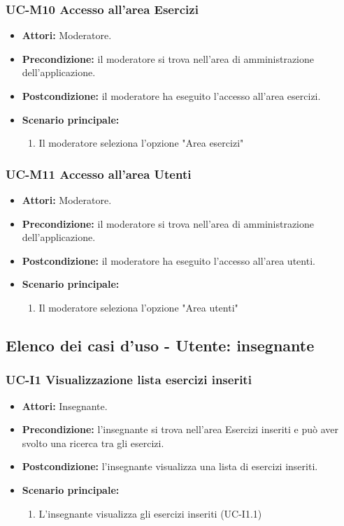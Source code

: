 \subsubsection{UC-M10 Accesso all'area Esercizi}
\begin{itemize}
	\item \textbf{Attori:} Moderatore.
	\item \textbf{Precondizione:} il moderatore si trova nell'area di amministrazione dell'applicazione.
	\item \textbf{Postcondizione:} il moderatore ha eseguito l'accesso all'area esercizi.
	\item \textbf{Scenario principale:}
	\begin{enumerate}
		\item Il moderatore seleziona l'opzione "Area esercizi"
	\end{enumerate}
\end{itemize}

\subsubsection{UC-M11 Accesso all'area Utenti}
\begin{itemize}
	\item \textbf{Attori:} Moderatore.
	\item \textbf{Precondizione:} il moderatore si trova nell'area di amministrazione dell'applicazione.
	\item \textbf{Postcondizione:} il moderatore ha eseguito l'accesso all'area utenti.
	\item \textbf{Scenario principale:}
	\begin{enumerate}
		\item Il moderatore seleziona l'opzione "Area utenti"
	\end{enumerate}
\end{itemize}

\subsection{Elenco dei casi d'uso - Utente: insegnante}		
\subsubsection{UC-I1 Visualizzazione lista esercizi inseriti}
\begin{itemize}
\item \textbf{Attori: }Insegnante.
		\item \textbf{Precondizione: }l'insegnante si trova nell'area Esercizi inseriti e può aver svolto una ricerca tra gli esercizi.
		\item \textbf{Postcondizione: }l'insegnante visualizza una lista di esercizi inseriti. 
		\item \textbf{Scenario principale:}
		\begin{enumerate}
			\item L'insegnante visualizza gli esercizi inseriti (UC-I1.1)
		\end{enumerate}
	\end{itemize}

